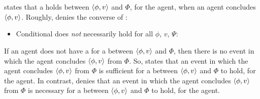 \section{\supportII{}}
\label{cha:ros:II}

\begin{note}
  \supportI{} states that a \ros{} holds between \(\langle \phi, v \rangle\) and \(\Phi\), for the agent, when an agent concludes \(\langle \phi, v \rangle\).
  Roughly, \supportII{} denies the converse of \supportI{}:

  \begin{idea}[\supportII{}]
    \label{idea:support:possible}
    \begin{itemize}
    \item
      Conditional does \emph{not} necessarily hold for all \(\phi\), \(v\), \(\Psi\):

    \end{itemize}
    \vspace{-\baselineskip}
  \end{idea}

  If an agent does not have a \wit{} for a \ros{} between \(\langle \phi, v \rangle\) and \(\Phi\), then there is no event in which the agent concludes \(\langle \phi, v \rangle\) from \(\Phi\).
  So, \supportI{} states that an event in which the agent concludes \(\langle \phi, v \rangle\) from \(\Phi\) is sufficient for a \ros{} between \(\langle \phi, v \rangle\) and \(\Phi\) to hold, for the agent.
  In contrast, \supportII{} denies that an event in which the agent concludes \(\langle \phi, v \rangle\) from \(\Phi\) is necessary for a \ros{} between \(\langle \phi, v \rangle\) and \(\Phi\) to hold, for the agent.
\end{note}

